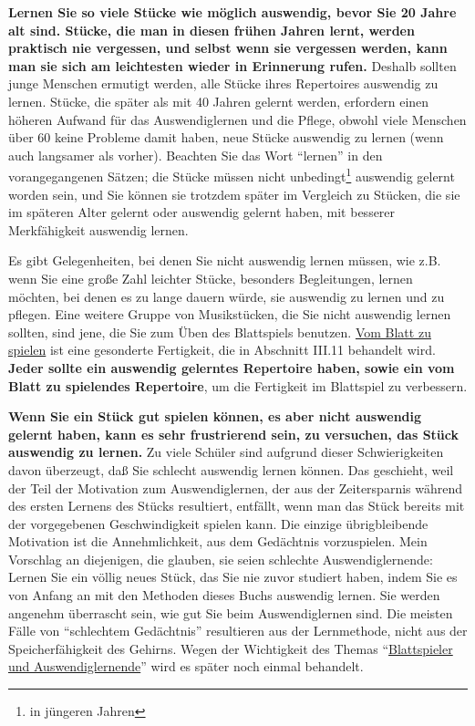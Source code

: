 \textbf{Lernen Sie so viele Stücke wie möglich auswendig, bevor Sie 20 Jahre alt sind.
Stücke, die man in diesen frühen Jahren lernt, werden praktisch nie vergessen, und selbst wenn sie vergessen werden, kann man sie sich am leichtesten wieder in Erinnerung rufen.}
Deshalb sollten junge Menschen ermutigt werden, alle Stücke ihres Repertoires auswendig zu lernen.
Stücke, die später als mit 40 Jahren gelernt werden, erfordern einen höheren Aufwand für das Auswendiglernen und die Pflege, obwohl viele Menschen über 60 keine Probleme damit haben, neue Stücke auswendig zu lernen (wenn auch langsamer als vorher).
Beachten Sie das Wort \enquote{lernen} in den vorangegangenen Sätzen; die Stücke müssen nicht unbedingt\footnote{in jüngeren Jahren} auswendig gelernt worden sein, und Sie können sie trotzdem später im Vergleich zu Stücken, die sie im späteren Alter gelernt oder auswendig gelernt haben, mit besserer Merkfähigkeit auswendig lernen.

Es gibt Gelegenheiten, bei denen Sie nicht auswendig lernen müssen, wie z.B. wenn Sie eine große Zahl leichter Stücke, besonders Begleitungen, lernen möchten, bei denen es zu lange dauern würde, sie auswendig zu lernen und zu pflegen.
Eine weitere Gruppe von Musikstücken, die Sie nicht auswendig lernen sollten, sind jene, die Sie zum Üben des Blattspiels benutzen.
\hyperlink{c1iii11}{Vom Blatt zu spielen} ist eine gesonderte Fertigkeit, die in Abschnitt III.11 behandelt wird.
\textbf{Jeder sollte ein auswendig gelerntes Repertoire haben, sowie ein vom Blatt zu spielendes Repertoire}, um die Fertigkeit im Blattspiel zu verbessern.

\textbf{Wenn Sie ein Stück gut spielen können, es aber nicht auswendig gelernt haben, kann es sehr frustrierend sein, zu versuchen, das Stück auswendig zu lernen.}
Zu viele Schüler sind aufgrund dieser Schwierigkeiten davon überzeugt, daß Sie schlecht auswendig lernen können.
Das geschieht, weil der Teil der Motivation zum Auswendiglernen, der aus der Zeitersparnis während des ersten Lernens des Stücks resultiert, entfällt, wenn man das Stück bereits mit der vorgegebenen Geschwindigkeit spielen kann.
Die einzige übrigbleibende Motivation ist die Annehmlichkeit, aus dem Gedächtnis vorzuspielen.
Mein Vorschlag an diejenigen, die glauben, sie seien schlechte Auswendiglernende: Lernen Sie ein völlig neues Stück, das Sie nie zuvor studiert haben, indem Sie es von Anfang an mit den Methoden dieses Buchs auswendig lernen.
Sie werden angenehm überrascht sein, wie gut Sie beim Auswendiglernen sind.
Die meisten Fälle von \enquote{schlechtem Gedächtnis} resultieren aus der Lernmethode, nicht aus der Speicherfähigkeit des Gehirns.
Wegen der Wichtigkeit des Themas \enquote{\hyperlink{c1iii6l}{Blattspieler und Auswendiglernende}} wird es später noch einmal behandelt.
 

